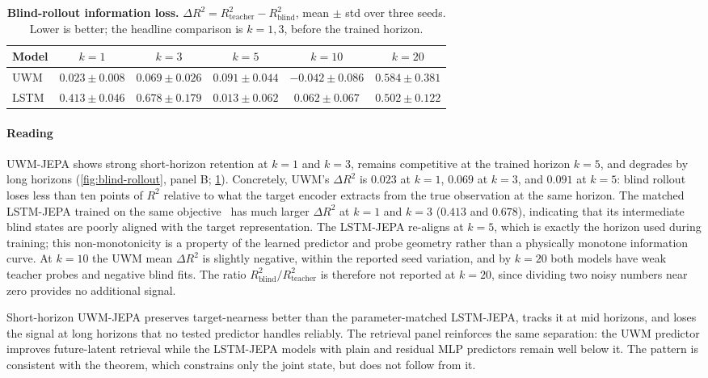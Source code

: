 \begin{table}[t]
\centering
\footnotesize
\setlength{\tabcolsep}{6pt}
\caption{\textbf{Blind-rollout information loss.}
$\Delta R^2=R^2_{\mathrm{teacher}}-R^2_{\mathrm{blind}}$, mean $\pm$
std over three seeds. Lower is better; the headline comparison is
$k=1,3$, before the trained horizon.}
\label{tab:retention}
\begin{tabular}{@{}lccccc@{}}
\toprule
Model & $k{=}1$ & $k{=}3$ & $k{=}5$ & $k{=}10$ & $k{=}20$ \\
\midrule
UWM  & $\mathbf{0.023\pm0.008}$ & $\mathbf{0.069\pm0.026}$ & $0.091\pm0.044$ & $-0.042\pm0.086$ & $0.584\pm0.381$ \\
LSTM & $0.413\pm0.046$ & $0.678\pm0.179$ & $\mathbf{0.013\pm0.062}$ & $0.062\pm0.067$ & $0.502\pm0.122$ \\
\bottomrule
\end{tabular}
\end{table}

\paragraph{Reading}
UWM-JEPA shows strong short-horizon retention at
$k{=}1$ and $k{=}3$, remains competitive at the trained horizon
$k{=}5$, and degrades by long horizons (\cref{fig:blind-rollout},
panel B; \cref{tab:retention}). Concretely, UWM's $\Delta R^2$ is
$0.023$ at $k{=}1$, $0.069$ at $k{=}3$, and $0.091$ at $k{=}5$: blind
rollout loses less than ten points of $R^2$ relative to what the
target encoder extracts from the true observation at the same horizon.
The matched LSTM-JEPA trained on the same
objective~\cite{hochreiter1997long} has much larger $\Delta R^2$ at
$k{=}1$ and $k{=}3$ ($0.413$ and $0.678$), indicating that its
intermediate blind states are poorly aligned with the target
representation. The LSTM-JEPA re-aligns at $k{=}5$, which is exactly
the horizon used during training; this non-monotonicity is a property
of the learned predictor and probe geometry rather than a physically
monotone information curve. At $k{=}10$ the UWM mean $\Delta R^2$ is
slightly negative, within the reported seed variation, and by $k{=}20$
both models have weak teacher probes and negative blind fits. The
ratio $R^2_{\text{blind}}/R^2_{\text{teacher}}$ is therefore not
reported at $k{=}20$, since dividing two noisy numbers near zero
provides no additional signal.

Short-horizon UWM-JEPA preserves target-nearness better than the
parameter-matched LSTM-JEPA, tracks it at mid horizons, and loses the
signal at long horizons that no tested predictor handles reliably. The
retrieval panel reinforces the same separation: the UWM predictor
improves future-latent retrieval while the LSTM-JEPA models with plain
and residual MLP predictors remain well below it. The pattern is
consistent with the theorem, which constrains only the joint state,
but does not follow from it.
